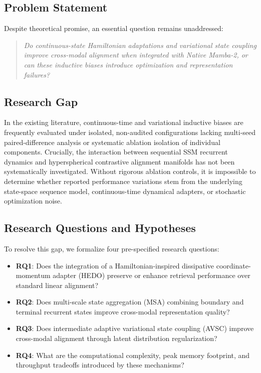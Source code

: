 \documentclass[conference]{IEEEtran}
\begin{document}
\subsection{Problem Statement}
Despite theoretical promise, an essential question remains unaddressed:
\begin{quote}
\textit{Do continuous-state Hamiltonian adaptations and variational state coupling improve cross-modal alignment when integrated with Native Mamba-2, or can these inductive biases introduce optimization and representation failures?}
\end{quote}

\subsection{Research Gap}
In the existing literature, continuous-time and variational inductive biases are frequently evaluated under isolated, non-audited configurations lacking multi-seed paired-difference analysis or systematic ablation isolation of individual components. Crucially, the interaction between sequential SSM recurrent dynamics and hyperspherical contrastive alignment manifolds has not been systematically investigated. Without rigorous ablation controls, it is impossible to determine whether reported performance variations stem from the underlying state-space sequence model, continuous-time dynamical adapters, or stochastic optimization noise.

\subsection{Research Questions and Hypotheses}
To resolve this gap, we formalize four pre-specified research questions:
\begin{itemize}
    \item \textbf{RQ1}: Does the integration of a Hamiltonian-inspired dissipative coordinate-momentum adapter (HEDO) preserve or enhance retrieval performance over standard linear alignment?
    \item \textbf{RQ2}: Does multi-scale state aggregation (MSA) combining boundary and terminal recurrent states improve cross-modal representation quality?
    \item \textbf{RQ3}: Does intermediate adaptive variational state coupling (AVSC) improve cross-modal alignment through latent distribution regularization?
    \item \textbf{RQ4}: What are the computational complexity, peak memory footprint, and throughput tradeoffs introduced by these mechanisms?
\end{itemize}
\end{document}
